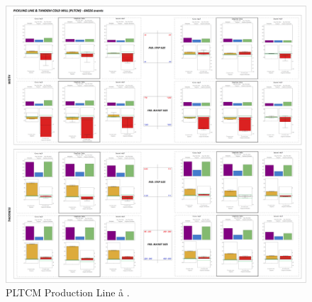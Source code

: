 \begin{landscape}
	\begin{figure}[ht]
		\centering
		\includegraphics[width=1.1\textwidth]{../images/supplements-PLTCM_real_life_events_analysis-results.png}
		\caption{PLTCM Production Line \aa{} \bb{}.}
		\label{figure-supplements-PLTCM}
	\end{figure}
\end{landscape}